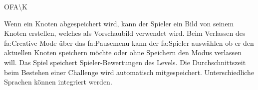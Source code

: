 \begin{ids}{\gls{OFA\K}}

	\id[ 470] Wenn ein Knoten abgespeichert wird, kann der Spieler ein Bild von seinem Knoten erstellen, welches als Vorschaubild verwendet wird.
	\id[ 480] Beim Verlassen des \gls{fa:Creative}-Mode über das \gls{fa:Pausemenu}  kann der \gls{fa:Spieler} auswählen ob er den aktuellen Knoten speichern möchte oder ohne Speichern den Modus verlassen will.
	\id[ 490] Das Spiel speichert Spieler-Bewertungen des Levels.
	\id[ 500] Die Durchschnittszeit beim Bestehen einer Challenge wird automatisch mitgespeichert.
	\id[ 510] Unterschiedliche Sprachen können integriert werden.
 	
 	
	
\end{ids}

~\\